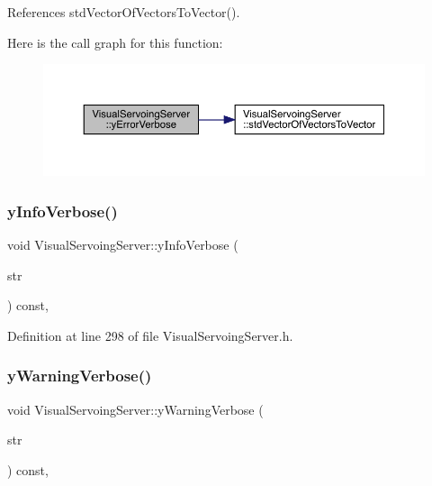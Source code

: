 References std\+Vector\+Of\+Vectors\+To\+Vector().

Here is the call graph for this function\+:
\nopagebreak
\begin{figure}[H]
\begin{center}
\leavevmode
\includegraphics[width=350pt]{classVisualServoingServer_a8eb3cf6c73a515f6f435f01327d37bd1_cgraph}
\end{center}
\end{figure}
\mbox{\label{classVisualServoingServer_a6b16f76335ebbd9e4ba9e5ddb67cf883}} 
\subsubsection{\texorpdfstring{y\+Info\+Verbose()}{yInfoVerbose()}}
{\footnotesize\ttfamily void Visual\+Servoing\+Server\+::y\+Info\+Verbose (\begin{DoxyParamCaption}\item[{const yarp\+::os\+::\+Const\+String \&}]{str }\end{DoxyParamCaption}) const\hspace{0.3cm}{\ttfamily [inline]}, {\ttfamily [private]}}



Definition at line 298 of file Visual\+Servoing\+Server.\+h.

\mbox{\label{classVisualServoingServer_a570985820c386689a9507066a016b839}} 
\subsubsection{\texorpdfstring{y\+Warning\+Verbose()}{yWarningVerbose()}}
{\footnotesize\ttfamily void Visual\+Servoing\+Server\+::y\+Warning\+Verbose (\begin{DoxyParamCaption}\item[{const yarp\+::os\+::\+Const\+String \&}]{str }\end{DoxyParamCaption}) const\hspace{0.3cm}{\ttfamily [inline]}, {\ttfamily [private]}}



